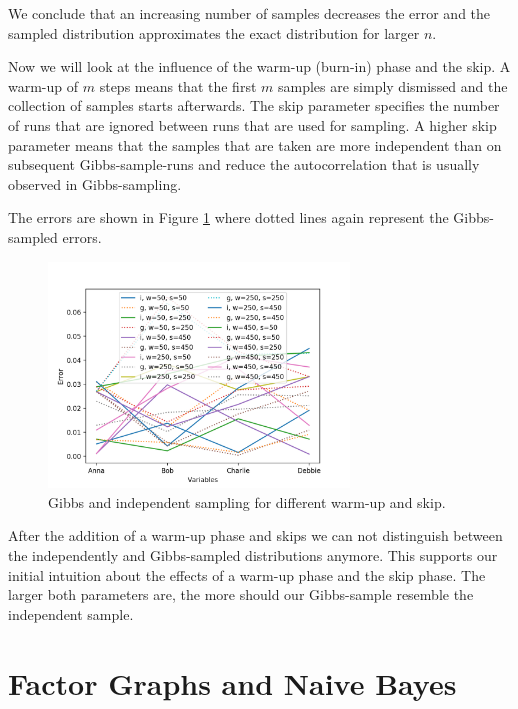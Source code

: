 \documentclass{support/acm_proc_article-sp}
\begin{document}
    We conclude that an increasing number of samples decreases the error and the sampled distribution approximates the
    exact distribution for larger $n$.

    Now we will look at the influence of the warm-up (burn-in) phase and the skip.
    A warm-up of $m$ steps means that the first $m$ samples are simply dismissed and the collection of samples starts
    afterwards.
    The skip parameter specifies the number of runs that are ignored between runs that are used for sampling.
    A higher skip parameter means that the samples that are taken are more independent than on subsequent Gibbs-sample-runs
    and reduce the autocorrelation that is usually observed in Gibbs-sampling.

    The errors are shown in Figure \ref{fig:gibbs-ws} where dotted lines again represent the Gibbs-sampled errors.
    \begin{figure}[!htbp]
        \centering
        \includegraphics[width=8cm]{images/gibbs-ws.png}
        \caption{Gibbs and independent sampling for different warm-up and skip.}
        \label{fig:gibbs-ws}
    \end{figure}

    After the addition of a warm-up phase and skips we can not distinguish between the independently and Gibbs-sampled
    distributions anymore.
    This supports our initial intuition about the effects of a warm-up phase and the skip phase.
    The larger both parameters are, the more should our Gibbs-sample resemble the independent sample.


    \section{Factor Graphs and Naive Bayes}
\end{document}
